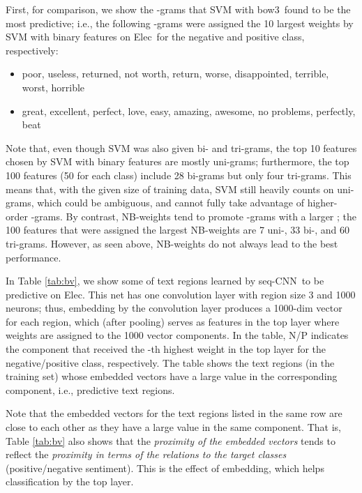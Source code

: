 \documentclass[11pt,letterpaper]{article}
\newcommand{\scnn}{seq-CNN}
\newcommand{\bowthree}{{bow3}}
\newcommand{\Elec}{Elec}
\begin{document}
First, for comparison,
we show the -grams that SVM with \bowthree\ found to be the most predictive; i.e., 
the following -grams were assigned the 10 largest weights by SVM with binary features on \Elec\ 
for the negative and positive class, respectively: 
\vspace{-0.1in}
\begin{itemize} \itemsep1pt \parskip0pt 
\item 
{\small
  poor, useless, returned, not worth, return, worse, disappointed, terrible, worst, horrible  }
\item
{\small
  great, excellent, perfect, love, easy, amazing, awesome, no problems, perfectly, beat
}  
\end{itemize}
\vspace{-0.05in}
Note that, even though SVM was also given bi- and tri-grams, 
the top 10 features chosen by SVM with binary features are mostly uni-grams; 
furthermore, the top 100 features (50 for each class) include 28 bi-grams but only four tri-grams. 
This means that, with the given size of training data, SVM still heavily counts on 
uni-grams, which could be ambiguous, and cannot fully take advantage of higher-order 
-grams.
By contrast, 
NB-weights tend to promote -grams with a larger ; the 100 features that were assigned 
the largest NB-weights are 7 uni-, 33 bi-, and 60 tri-grams.  
However, as seen above, NB-weights do not always lead to the best performance.  

In Table \ref{tab:bv}, 
we show some of text regions learned by \scnn\ to be predictive on \Elec.  
This net has one convolution layer with region size 3 and 1000 neurons; 
thus, embedding by the convolution layer produces a 1000-dim vector 
for each region, which (after pooling) serves as features in the top layer
where weights are assigned to the 1000 vector components.  
In the table, N/P indicates the component that received 
the -th highest weight in the top layer 
for the negative/positive class, respectively. The table shows the text regions 
(in the training set) whose embedded vectors have a large value
in the corresponding component, i.e., predictive text regions.  

Note that the embedded vectors for the text regions listed in the same row 
are close to each other as they have a large value in the same component. 
That is, Table \ref{tab:bv} also shows that
the {\em proximity of the embedded vectors} tends to reflect the {\em proximity  
in terms of the relations to the target classes} (positive/negative sentiment). 
This is the effect of embedding, which helps classification by the top layer.  
\end{document}

